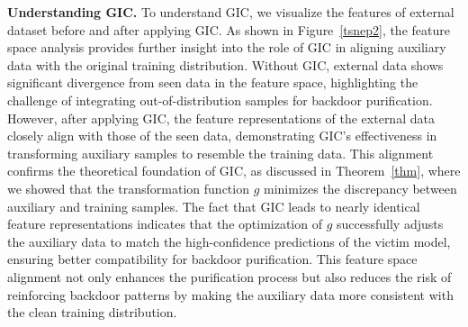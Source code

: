 \textbf{Understanding GIC.}  
To understand GIC, we visualize the features of external dataset before and after applying GIC. As shown in Figure~\ref{tsnep2}, the feature space analysis provides further insight into the role of GIC in aligning auxiliary data with the original training distribution. Without GIC, external data shows significant divergence from seen data in the feature space, highlighting the challenge of integrating out-of-distribution samples for backdoor purification. However, after applying GIC, the feature representations of the external data closely align with those of the seen data, demonstrating GIC’s effectiveness in transforming auxiliary samples to resemble the training data. This alignment confirms the theoretical foundation of GIC, as discussed in Theorem~\ref{thm}, where we showed that the transformation function \( g \) minimizes the discrepancy between auxiliary and training samples. 
%
The fact that GIC leads to nearly identical feature representations indicates that the optimization of \( g \) successfully adjusts the auxiliary data to match the high-confidence predictions of the victim model, ensuring better compatibility for backdoor purification. This feature space alignment not only enhances the purification process but also reduces the risk of reinforcing backdoor patterns by making the auxiliary data more consistent with the clean training distribution.
